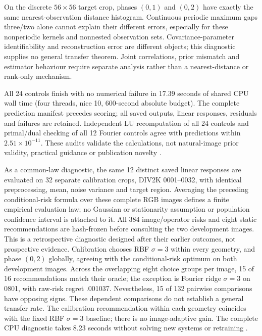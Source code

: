 On the discrete $56\times56$ target crop, phases $(0,1)$ and $(0,2)$
have exactly the same nearest-observation distance histogram. Continuous
periodic maximum gaps three/two alone cannot explain their different
errors, especially for these nonperiodic kernels and nonnested observation
sets. Covariance-parameter identifiability and reconstruction error are
different objects; this diagnostic supplies no general transfer theorem.
Joint correlations, prior mismatch and estimator behaviour require
separate analysis rather than a nearest-distance or rank-only mechanism.

All 24 controls finish with no numerical failure in 17.39 seconds of
shared CPU wall time (four threads, nice 10, 600-second absolute budget).
The complete prediction manifest precedes scoring; all saved outputs,
linear responses, residuals and failures are retained. Independent LU
recomputation of all 24 controls and primal/dual checking of all 12
Fourier controls agree with predictions within $2.51\times10^{-11}$.
These audits validate the calculations, not natural-image prior validity,
practical guidance or publication novelty .

As a common-law diagnostic, the same 12 distinct saved linear responses
are evaluated on 32 separate calibration crops, DIV2K 0001--0032, with
identical preprocessing, mean, noise variance and target region. Averaging
the preceding conditional-risk formula over these complete RGB images
defines a finite empirical evaluation law; no Gaussian or stationarity
assumption or population confidence interval is attached to it. All 384
image/operator risks and eight static recommendations are hash-frozen
before consulting the two development images. This is a retrospective
diagnostic designed after their earlier outcomes, not prospective evidence.
Calibration chooses RBF $\sigma=3$ within every geometry, and phase $(0,2)$
globally, agreeing with the conditional-risk optimum on both development
images. Across the overlapping eight choice groups per image, 15 of 16
recommendations match their oracle; the exception is Fourier ridge
$\sigma=3$ on 0801, with raw-risk regret .001037. Nevertheless, 15 of 132
pairwise comparisons have opposing signs. These dependent comparisons
do not establish a general transfer rate. The calibration recommendation
within each geometry coincides with the fixed RBF $\sigma=3$ baseline;
there is no image-adaptive gain. The complete CPU diagnostic takes 8.23
seconds without solving new systems or retraining .

